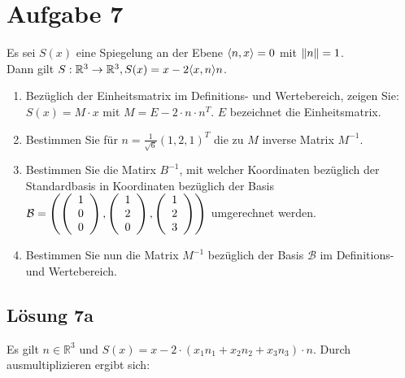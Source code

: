 \documentclass[main.tex]{subfiles}
\begin{document}
\section{Aufgabe 7}
Es sei $S(x)$ eine Spiegelung an der Ebene $\scalarprod{n,x} = 0$ mit $\norm{n} = 1$.\\
Dann gilt $S:\mathbb{R}^3 \to \mathbb{R}^3, S(x) = x-2 \scalarprod{x,n} n$.

\begin{enumerate}
    \item Bezüglich der Einheitsmatrix im Definitions- und Wertebereich, zeigen Sie:
    $S(x) = M\cdot x$ mit $M = E-2\cdot n \cdot n^T$. $E$ bezeichnet die Einheitsmatrix.
    \item Bestimmen Sie für $n = \frac{1}{\sqrt{6}} (1, 2, 1)^T$ die zu $M$ inverse Matrix $M^{-1}$.
    \item Bestimmen Sie die Matirx $B^{-1}$, mit welcher Koordinaten bezüglich der Standardbasis in Koordinaten bezüglich der Basis
    $\mathcal{B} = \left( \eqmatrix{c}{1 \\ 0 \\ 0}, \eqmatrix{c}{1 \\ 2 \\ 0}, \eqmatrix{c}{1 \\ 2 \\ 3} \right)$ umgerechnet werden.
    \item Bestimmen Sie nun die Matrix $M^{-1}$ bezüglich der Basis $\mathcal{B}$ im Definitions- und Wertebereich.
\end{enumerate}

\subsection{Lösung 7a}

Es gilt $n\in \mathbb{R}^3$ und $S(x) = x - 2\cdot \left(x_1n_1 + x_2n_2 + x_3n_3\right) \cdot n$. Durch ausmultiplizieren ergibt sich:
\end{document}
